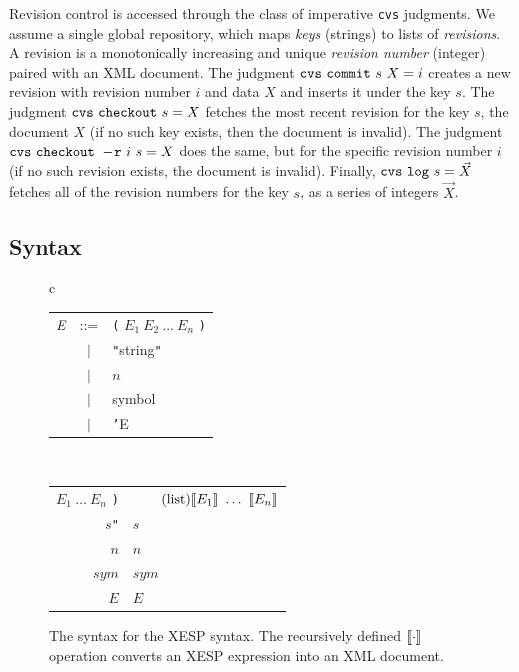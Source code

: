 \documentclass[twocolumn]{article}
\begin{document}
Revision control is accessed through the class of imperative {\tt cvs}
judgments. We assume a single global repository, which maps {\em keys}
(strings) to lists of {\em revisions}. A revision is a monotonically
increasing and unique {\em revision number} (integer) paired with an
XML document. The judgment ${\tt cvs\ commit}\ s\ X = i$ creates a new
revision with revision number $i$ and data $X$ and inserts it under
the key $s$. The judgment ${\tt cvs\ checkout}\ s = X$ fetches the
most recent revision for the key $s$,\z{} the
document $X$ (if no such key exists, then the document is invalid).
The judgment ${\tt cvs\ checkout\ -\!r}\ i\ s = X$ does the same, but
for the specific revision number $i$ (if no such
revision exists, the document is invalid). Finally, ${\tt cvs\ log}\ s
= \vec{X}$ fetches all of the revision numbers for the key $s$, as a
series of integers $\vec{X}$.

\subsection{Syntax}

\begin{figure}[htb]
\begin{center}
\begin{tabular}{c}
  \begin{tabular}{rcl}
   {\em E} & ::= & {\tt(} $E_1\ E_2\ \ldots\ E_n$ {\tt)} \\
           & $|$ & {\tt"}string{\tt"} \\
           & $|$ & $n$ \\
           & $|$ & symbol \\
           & $|$ & {\tt'}E \\
  \end{tabular} \\[3em]

  \begin{tabular}{r@{\,\,=\,\,}l}
   \lb {\tt(} $E_1\ \ldots\ E_n$ {\tt)}\rb & $\tag{list}{ \lb E_1 \rb\ \ldots\ \lb E_n \rb}$ \\
   \lb {\tt"}$s${\tt"}\rb & $\tag{string}{s}$ \\
   \lb $n$\rb & $\tag{int}{n}$ \\
   \lb $sym$\rb & $\tag{symbol}{sym}$ \\
   \lb {\tt'}$E$\rb & $\tag{quote}{E}$ \\
  \end{tabular}

\end{tabular}
\end{center}
\caption{The syntax for the XESP syntax. The recursively defined $[\![
\cdot ]\!]$ operation converts an XESP expression into an XML
document.} \label{fig:xesp}
\end{figure}
\end{document}
